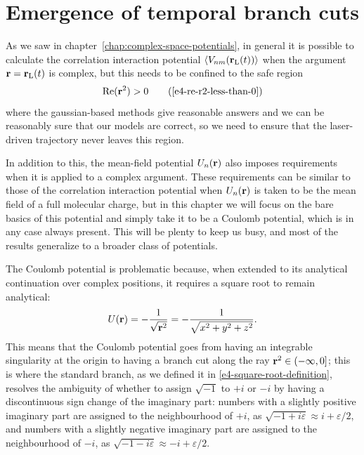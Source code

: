 \section{Emergence of temporal branch cuts}
As we saw in chapter~\ref{chap:complex-space-potentials}, in general it is possible to calculate the correlation interaction potential $\left\langle V_{nm}\mathopen{}\left( \vb{r}_\mathrm{L}(t) \right)\mathclose{} \right\rangle$ when the argument $\vb{r}=\vb{r}_\mathrm{L}(t)$ is complex, but this needs to be confined to the safe region
\begin{equation}
\Re(\vbr^2)>0
\backtag{e4-re-r2-less-than-0}
\end{equation}
where the gaussian-based methods give reasonable answers and we can be reasonably sure that our models are correct, so we need to ensure that the laser-driven trajectory never leaves this region.

In addition to this, the mean-field potential $U_n(\vb{r})$ also imposes requirements when it is applied to a complex argument. These requirements can be similar to those of the correlation interaction potential when $U_n(\vb{r})$ is taken to be the mean field of a full molecular charge, but in this chapter we will focus on the bare basics of this potential and simply take it to be a Coulomb potential, which is in any case always present. This will be plenty to keep us busy, and most of the results generalize to a broader class of potentials.

The Coulomb potential is problematic because, when extended to its analytical continuation over complex positions, it requires a square root to remain analytical:
\begin{equation}
U(\vb{r}) = -\frac{1}{\sqrt{\vb{r}^2}}= -\frac{1}{\sqrt{x^2+y^2+z^2}}.
\label{e5-coulomb-potential}
\end{equation}
This means that the Coulomb potential goes from having an integrable singularity at the origin to having a branch cut along the ray $\vb{r}^2\in (-\infty,0]$; this is where the standard branch, as we defined it in \eqref{e4-square-root-definition}, resolves the ambiguity of whether to assign $\sqrt{-1}$ to $+i$ or $-i$ by having a discontinuous sign change of the imaginary part: numbers with a slightly positive imaginary part are assigned to the neighbourhood of $+i$, as $\sqrt{-1+i\varepsilon}\approx i+\varepsilon/2$, and numbers with a slightly negative imaginary part are assigned to the neighbourhood of $-i$, as $\sqrt{-1-i\varepsilon}\approx -i+\varepsilon/2$.



